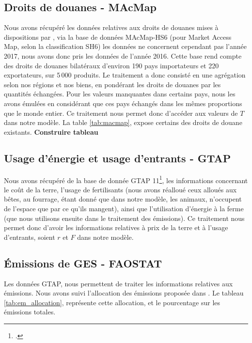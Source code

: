 \subsection{Droits de douanes - MAcMap}

Nous avons récupéré les données relatives aux droits de douanes mises à dispositions par \cite{Guimbard2012}, via la base de données MAcMap-HS6 (pour Market Access Map, selon la classification SH6) les données ne concernent cependant pas l'année 2017, nous avons donc pris les données de l'année 2016. Cette base rend compte des droits de douanes bilatéraux d'environ 190 pays importateurs et 220 exportateurs, sur 5\,000 produits. Le traitement a donc consisté en une agrégation selon nos régions et nos biens, en pondérant les droits de douanes par les quantités échangées. Pour les valeurs manquantes dans certains pays, nous les avons émulées en considérant que ces pays échangés dans les mêmes proportions que le monde entier. Ce traitement nous permet donc d'accéder aux valeurs de $T$ dans notre modèle. La table \ref{tab:macmap}, expose certains des droits de douane existants. \textbf{Construire tableau}


\subsection{Usage d'énergie et usage d'entrants - GTAP}

Nous avons récupéré de la base de donnée GTAP 11\footcite{Aguiar2022}, les informations concernant le coût de la terre, l'usage de fertilisants (nous avons réalloué ceux alloués aux bêtes, au fourrage, étant donné que dans notre modèle, les animaux, n'occupent de l'espace que par ce qu'ils mangent), ainsi que l'utilisation d'énergie à la ferme (que nous utilisons ensuite dans le traitement des émissions). Ce traitement nous permet donc d'avoir les informations relatives à prix de la terre et à l'usage d'entrants, soient $r$ et $F$ dans notre modèle.


\subsection{Émissions de GES - FAOSTAT}

Les données GTAP, nous permettent de traiter les informations relatives aux émissions. Nous avons suivi l'allocation des émissions proposée dans \cite{Valin2023}. Le tableau \ref{tab:em_allocation}, représente cette allocation, et le pourcentage sur les émissions totales.

